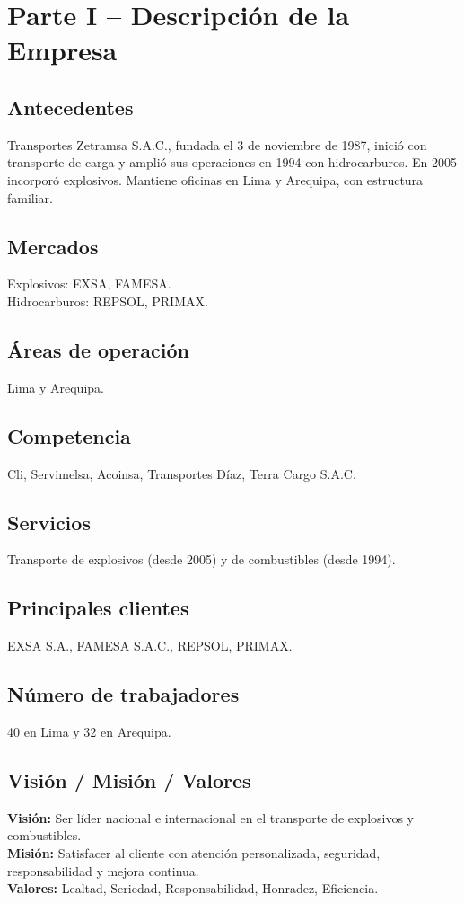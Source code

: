 \documentclass[a4paber,12pt]{article}
\begin{document}
	\section*{Parte I – Descripción de la Empresa}
	\subsection{Antecedentes}
	Transportes Zetramsa S.A.C., fundada el 3 de noviembre de 1987, inició con transporte de carga y amplió sus operaciones en 1994 con hidrocarburos. En 2005 incorporó explosivos. Mantiene oficinas en Lima y Arequipa, con estructura familiar.
	
	\subsection{Mercados}
	Explosivos: EXSA, FAMESA.\\
	Hidrocarburos: REPSOL, PRIMAX.
	
	\subsection{Áreas de operación}
	Lima y Arequipa.
	
	\subsection{Competencia}
	Cli, Servimelsa, Acoinsa, Transportes Díaz, Terra Cargo S.A.C.
	
	\subsection{Servicios}
	Transporte de explosivos (desde 2005) y de combustibles (desde 1994).
	
	\subsection{Principales clientes}
	EXSA S.A., FAMESA S.A.C., REPSOL, PRIMAX.
	
	\subsection{Número de trabajadores}
	40 en Lima y 32 en Arequipa.
	
	\subsection{Visión / Misión / Valores}
	\textbf{Visión:} Ser líder nacional e internacional en el transporte de explosivos y combustibles.\\
	\textbf{Misión:} Satisfacer al cliente con atención personalizada, seguridad, responsabilidad y mejora continua.\\
	\textbf{Valores:} Lealtad, Seriedad, Responsabilidad, Honradez, Eficiencia.
	
\end{document}
